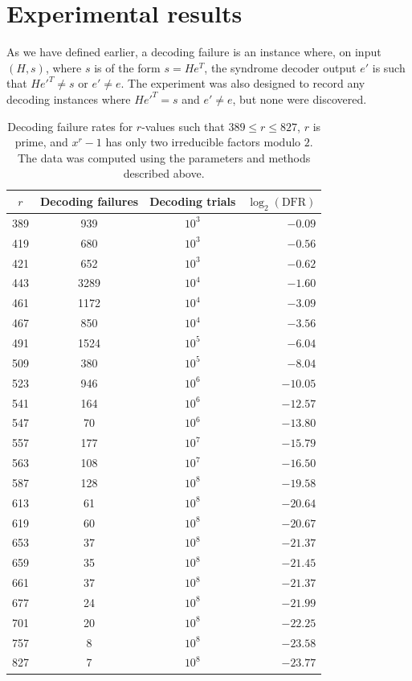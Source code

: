 \section{Experimental results}

As we have defined earlier, a decoding failure is an instance where, on input $(H,s)$, where $s$ is of the form $s=He^T$, the syndrome decoder output $e'$ is such that $He'^T \ne s$ or $e' \ne e$.  The experiment was also designed to record any decoding instances where $He'^T=s$ and $e'\ne e$, but none were discovered. 

\begin{table}[ht]
    \begin{center}
        \begin{tabular}{c|c|c|r}
            \;\;\;$r$\;\;\; & \;Decoding failures\;  & \;Decoding trials\;  & \;$\log_2(\mathrm{DFR})$ \\
            \hline
            389 & 939 & $10^3$ & $-0.09$ \\
            419 & 680 & $10^3$ & $-0.56$ \\
            421 & 652 & $10^3$ & $-0.62$ \\
            443 & 3289 & $10^4$ & $-1.60$ \\
            461 & 1172 & $10^4$ & $-3.09$ \\
            467 & 850 & $10^4$ & $-3.56$ \\
            491 & 1524 & $10^5$ & $-6.04$ \\
            509 & 380 & $10^5$ & $-8.04$ \\
            523 & 946 & $10^6$ & $-10.05$ \\
            541 & 164 & $10^6$ & $-12.57$ \\
            547 & 70 & $10^6$ & $-13.80$ \\
            557 & 177 & $10^7$ & $-15.79$ \\
            563 & 108 & $10^7$ & $-16.50$ \\
            587 & 128 & $10^8$ & $-19.58$ \\
            613 & 61 & $10^8$ & $-20.64$ \\
            619 & 60 & $10^8$ & $-20.67$ \\
            653 & 37 & $10^8$ & $-21.37$ \\
            659 & 35 & $10^8$ & $-21.45$ \\
            661 & 37 & $10^8$ & $-21.37$ \\
            677 & 24 & $10^8$ & $-21.99$ \\
            701 & 20 & $10^8$ & $-22.25$ \\
            757 & 8 & $10^8$ & $-23.58$ \\
            827 & 7 & $10^8$ & $-23.77$
        \end{tabular}
    \end{center}
    \caption{Decoding failure rates for $r$-values such that $389 \leq r \leq 827$, $r$ is prime, and $x^r - 1$ has only two irreducible factors modulo $2$. The data was computed using the parameters and methods described above.}
    \label{table:DFR}
\end{table}

